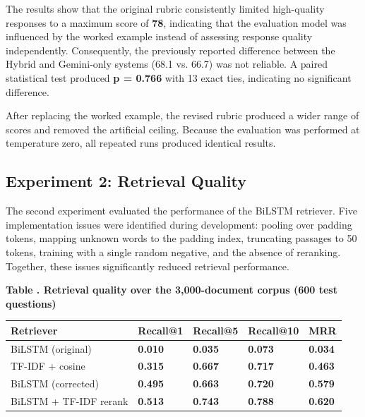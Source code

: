 The results show that the original rubric consistently limited high-quality responses to a maximum score of \textbf{78}, indicating that the evaluation model was influenced by the worked example instead of assessing response quality independently. Consequently, the previously reported difference between the Hybrid and Gemini-only systems (68.1 vs. 66.7) was not reliable. A paired statistical test produced \textbf{p = 0.766} with 13 exact ties, indicating no significant difference.

After replacing the worked example, the revised rubric produced a wider range of scores and removed the artificial ceiling. Because the evaluation was performed at temperature zero, all repeated runs produced identical results.

\subsection{Experiment 2: Retrieval Quality}

The second experiment evaluated the performance of the BiLSTM retriever. Five implementation issues were identified during development: pooling over padding tokens, mapping unknown words to the padding index, truncating passages to 50 tokens, training with a single random negative, and the absence of reranking. Together, these issues significantly reduced retrieval performance.

\par\medskip
\noindent\begin{minipage}{\textwidth}
\label{tab:5}
\noindent\textbf{Table \thetable. Retrieval quality over the 3,000-document corpus (600 test questions)}\par
\medskip
\begin{center}
\small
\setlength{\tabcolsep}{5pt}
\begin{tabular}{>{\raggedright\arraybackslash}p{}>{\centering\arraybackslash}p{}>{\centering\arraybackslash}p{}>{\centering\arraybackslash}p{}>{\centering\arraybackslash}p{}}
\toprule
\textbf{Retriever} & \textbf{Recall@1} & \textbf{Recall@5} & \textbf{Recall@10} & \textbf{MRR} \\
\midrule
BiLSTM (original) & \textbf{0.010} & \textbf{0.035} & \textbf{0.073} & \textbf{0.034} \\
TF-IDF + cosine & \textbf{0.315} & \textbf{0.667} & \textbf{0.717} & \textbf{0.463} \\
BiLSTM (corrected) & \textbf{0.495} & \textbf{0.663} & \textbf{0.720} & \textbf{0.579} \\
BiLSTM + TF-IDF rerank & \textbf{0.513} & \textbf{0.743} & \textbf{0.788} & \textbf{0.620} \\
\bottomrule
\end{tabular}
\end{center}
\end{minipage}
\par\medskip


